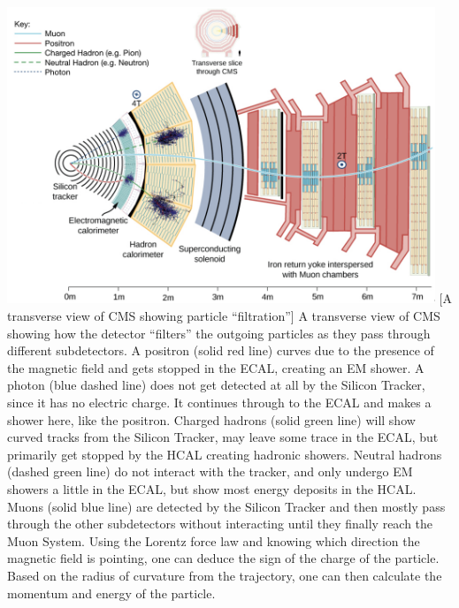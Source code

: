 \begin{multiFigure}
    \centering
    \includegraphics[width=0.96\textwidth,keepaspectratio]{figures/cms/cms_transverse_particletrajectories_corrected.png}
        [A transverse view of CMS showing particle ``filtration'']
        {
        A transverse view of CMS showing how the detector ``filters'' the outgoing particles as they pass through different subdetectors.
        A positron (solid red line) curves due to the presence of the magnetic field and gets stopped in the ECAL, creating an EM shower.
        A photon (blue dashed line) does not get detected at all by the Silicon Tracker, since it has no electric charge.
        It continues through to the ECAL and makes a shower here, like the positron.
        Charged hadrons (solid green line) will show curved tracks from the Silicon Tracker, may leave some trace in the ECAL, but primarily get stopped by the HCAL creating hadronic showers.
        Neutral hadrons (dashed green line) do not interact with the tracker, and only undergo EM showers a little in the ECAL, but show most energy deposits in the HCAL.
        Muons (solid blue line) are detected by the Silicon Tracker and then mostly pass through the other subdetectors without interacting until they finally reach the Muon System.
        Using the Lorentz force law and knowing which direction the magnetic field is pointing, one can deduce the sign of the charge of the particle. 
        Based on the radius of curvature from the trajectory, one can then calculate the momentum and energy of the particle.
        } 
    \label{fig:cms_particle_trajectories}
\end{multiFigure}
